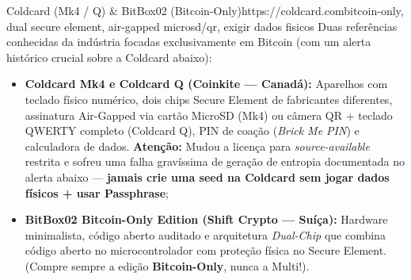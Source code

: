 \documentclass{pousadaguide}
\begin{document}
\begin{ferramenta}[logo=coldcard,logo2=bitbox]{Coldcard (Mk4 / Q) \& BitBox02 (Bitcoin-Only)}{https://coldcard.com}{bitcoin-only, dual secure element, air-gapped microsd/qr, exigir dados fisicos}
Duas referências conhecidas da indústria focadas exclusivamente em Bitcoin (com um alerta histórico crucial sobre a Coldcard abaixo):
\begin{itemize}
  \item \textbf{Coldcard Mk4 e Coldcard Q (Coinkite — Canadá):} Aparelhos com teclado físico numérico, dois chips Secure Element de fabricantes diferentes, assinatura Air-Gapped via cartão MicroSD (Mk4) ou câmera QR + teclado QWERTY completo (Coldcard Q), PIN de coação (\emph{Brick Me PIN}) e calculadora de dados. \textbf{Atenção:} Mudou a licença para \emph{source-available} restrita e sofreu uma falha gravíssima de geração de entropia documentada no alerta abaixo — \textbf{jamais crie uma seed na Coldcard sem jogar dados físicos + usar Passphrase};
  \item \textbf{BitBox02 Bitcoin-Only Edition (Shift Crypto — Suíça):} Hardware minimalista, código aberto auditado e arquitetura \emph{Dual-Chip} que combina código aberto no microcontrolador com proteção física no Secure Element. (Compre sempre a edição \textbf{Bitcoin-Only}, nunca a Multi!).
\end{itemize}
\end{ferramenta}
\end{document}

